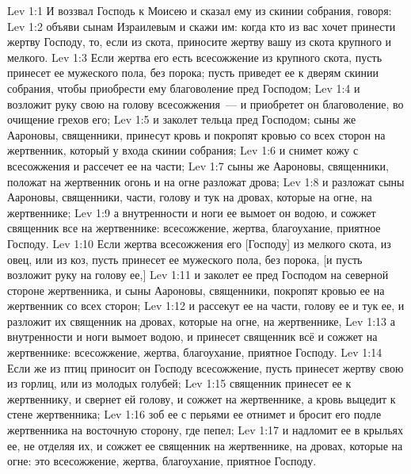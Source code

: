 \vs Lev 1:1 И воззвал Господь к Моисею и сказал ему из скинии собрания, говоря:
\vs Lev 1:2 объяви сынам Израилевым и скажи им: когда кто из вас хочет принести жертву Господу, то, если из скота, приносите жертву вашу из скота крупного и мелкого.
\vs Lev 1:3 Если жертва его есть всесожжение из крупного скота, пусть принесет ее мужеского пола, без порока; пусть приведет ее к дверям скинии собрания, чтобы приобрести ему благоволение пред Господом;
\vs Lev 1:4 и возложит руку свою на голову  всесожжения~--- и приобретет он благоволение, во очищение грехов его;
\vs Lev 1:5 и заколет тельца пред Господом; сыны же Аароновы, священники, принесут кровь и покропят кровью со всех сторон на жертвенник, который у входа скинии собрания;
\vs Lev 1:6 и снимет кожу с  всесожжения и рассечет ее на части;
\vs Lev 1:7 сыны же Аароновы, священники, положат на жертвенник огонь и на огне разложат дрова;
\vs Lev 1:8 и разложат сыны Аароновы, священники, части, голову и тук на дровах, которые на огне, на жертвеннике;
\vs Lev 1:9 а внутренности  и ноги ее вымоет он водою, и сожжет священник все на жертвеннике:  всесожжение, жертва, благоухание, приятное Господу.
\rsbpar\vs Lev 1:10 Если жертва всесожжения его [Господу] из мелкого скота, из овец, или из коз, пусть принесет ее мужеского пола, без порока, [и пусть возложит руку на голову ее,]
\vs Lev 1:11 и заколет ее пред Господом на северной стороне жертвенника, и сыны Аароновы, священники, покропят кровью ее на жертвенник со всех сторон;
\vs Lev 1:12 и рассекут ее на части,  голову ее и тук ее, и разложит их священник на дровах, которые на огне, на жертвеннике,
\vs Lev 1:13 а внутренности и ноги вымоет водою, и принесет священник всё и сожжет на жертвеннике:  всесожжение, жертва, благоухание, приятное Господу.
\rsbpar\vs Lev 1:14 Если же из птиц приносит он Господу всесожжение, пусть принесет жертву свою из горлиц, или из молодых голубей;
\vs Lev 1:15 священник принесет ее к жертвеннику, и свернет ей голову, и сожжет на жертвеннике, а кровь выцедит к стене жертвенника;
\vs Lev 1:16 зоб ее с перьями ее отнимет и бросит его подле жертвенника на восточную сторону, где пепел;
\vs Lev 1:17 и надломит ее в крыльях ее, не отделяя их, и сожжет ее священник на жертвеннике, на дровах, которые на огне: это всесожжение, жертва, благоухание, приятное Господу.
